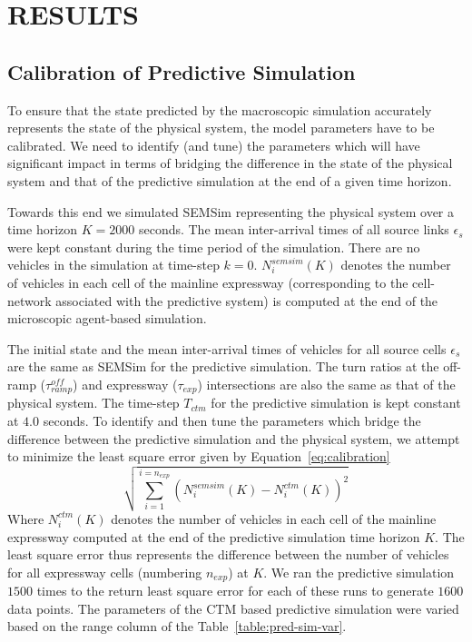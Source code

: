 \documentclass[12pt]{article}
\begin{document}
\section{RESULTS}
\label{sec:experiments}

\subsection{Calibration of Predictive Simulation}

To ensure that the state predicted by the macroscopic simulation accurately represents the state of the physical system, the model parameters have to be calibrated. We need to identify (and tune) the parameters which will have significant impact in terms of bridging the difference in the state of the physical system and that of the predictive simulation at the end of a given time horizon.

Towards this end we simulated SEMSim representing the physical system over a time horizon $K=2000$ seconds. The mean inter-arrival times of all source links $\epsilon_s$ were kept constant during the time period of the simulation. There are no vehicles in the simulation at time-step $k=0$. $N_i^{semsim}(K)$ denotes the number of vehicles in each cell of the mainline expressway (corresponding to the cell-network associated with the predictive system) is computed at the end of the microscopic agent-based simulation. 

The initial state and the mean inter-arrival times of vehicles for all source cells $\epsilon_{s}$ are the same as SEMSim for the predictive simulation. The turn ratios at the off-ramp ($\tau_{ramp}^{off}$) and expressway ($\tau_{exp}$) intersections are also the same as that of the physical system. The time-step $T_{ctm}$ for the predictive simulation is kept constant at $4.0$ seconds. To identify and then tune the parameters which bridge the difference between the predictive simulation and the physical system, we attempt to minimize the least square error given by Equation~\ref{eq:calibration}
\begin{equation}
\label{eq:calibration}
\sqrt{\sum\limits_{i=1}^{i=n_{exp}}(N_i^{semsim}(K)-N_i^{ctm}(K))^2}
\end{equation}
Where $N_i^{ctm}(K)$ denotes the number of vehicles in each cell of the mainline expressway computed at the end of the predictive simulation time horizon $K$. The least square error thus represents the difference between the number of vehicles for all expressway cells (numbering $n_{exp}$) at $K$. We ran the predictive simulation $1500$ times to the return least square error for each of these runs to generate $1600$ data points. The parameters of the CTM based predictive simulation were varied based on the range column of the Table~\ref{table:pred-sim-var}.
\end{document}
